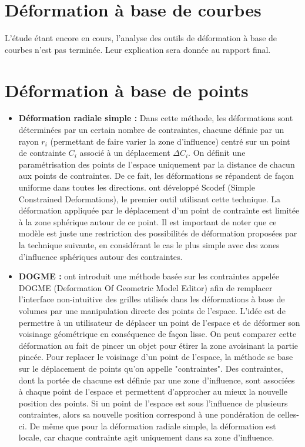 \section{Déformation à base de courbes}
L'étude étant encore en cours, l'analyse des outils de déformation à
base de courbes n'est pas terminée. Leur explication sera donnée au
rapport final.

\section{Déformation à base de points}
\begin{itemize}
\item{\textbf{Déformation radiale simple :}} Dans cette méthode, les
  déformations sont déterminées par un certain nombre de contraintes,
  chacune définie par un rayon $r_i$ (permettant de faire varier la
  zone d'influence) centré sur un point de contrainte $C_i$ associé à
  un déplacement $\Delta C_i$. On définit une paramétrisation des
  points de l'espace uniquement par la distance de chacun aux points
  de contraintes. De ce fait, les déformations se répandent de façon
  uniforme dans toutes les directions. \cite{BR94} ont développé
  Scodef (Simple Constrained Deformations), le premier outil utilisant
  cette technique. La déformation appliquée par le déplacement d'un
  point de contrainte est limitée à la zone sphérique autour de ce
  point. Il est important de noter que ce modèle est juste une
  restriction des possibilités de déformation proposées par la
  technique suivante, en considérant le cas le plus simple avec des
  zones d'influence sphériques autour des contraintes.
\item{\textbf{DOGME :}} \cite{BB91} ont introduit une méthode basée
  sur les contraintes appelée DOGME (Deformation Of Geometric Model
  Editor) afin de remplacer l'interface non-intuitive des grilles
  utilisés dans les déformations à base de volumes par une
  manipulation directe des points de l'espace. L'idée est de permettre
  à un utilisateur de déplacer un point de l'espace et de déformer son
  voisinage géométrique en conséquence de façon lisse. On peut
  comparer cette déformation au fait de pincer un objet pour étirer la
  zone avoisinant la partie pincée. Pour replacer le voisinage d'un
  point de l'espace, la méthode se base sur le déplacement de points
  qu'on appelle "contraintes". Des contraintes, dont la portée de
  chacune est définie par une zone d'influence, sont associées à
  chaque point de l'espace et permettent d'approcher au mieux la
  nouvelle position des points. Si un point de l'espace est sous
  l'influence de plusieurs contraintes, alors sa nouvelle position
  correspond à une pondération de celles-ci. De même que pour la
  déformation radiale simple, la déformation est locale, car chaque
  contrainte agit uniquement dans sa zone d'influence.
\end{itemize}

